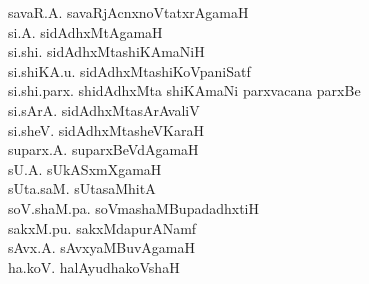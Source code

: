 {\begin{multicols}{2}
\begin{tabbing}
savaR.A. \> savaRjAcnxnoVtatxrAgamaH\\[2pt]
si.A. \> sidAdhxMtAgamaH\\[2pt]
si.shi. \> sidAdhxMtashiKAmaNiH\\[2pt]
si.shiKA.u. \> sidAdhxMtashiKoVpaniSatf\\[2pt]
si.shi.parx. \> shidAdhxMta shiKAmaNi parxvacana parxBe\\[2pt]
si.sArA. \> sidAdhxMtasArAvaliV\\[2pt]
si.sheV. \> sidAdhxMtasheVKaraH\\[2pt]
suparx.A. \> suparxBeVdAgamaH\\[2pt]
sU.A. \> sUkASxmXgamaH\\[2pt]
sUta.saM. \> sUtasaMhitA\\[2pt]
soV.shaM.pa. \> soVmashaMBupadadhxtiH\\[2pt]
sakxM.pu. \> sakxMdapurANamf\\[2pt]
sAvx.A. \> sAvxyaMBuvAgamaH\\[2pt]
ha.koV. \> halAyudhakoVshaH
\end{tabbing}
\end{multicols}
}


